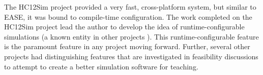 The HC12Sim project provided a very fast, cross-platform system, but similar to EASE, it was bound to compile-time configuration. The work completed on the HC12Sim project lead the author to develop the idea of runtime-configurable simulations (a known entity in other projects \cite{Skrien2001, Black2013}). This runtime-configurable feature is the paramount feature in any project moving forward. Further, several other projects had distinguishing features that are investigated in feasibility discussions to attempt to create a better simulation software for teaching.
